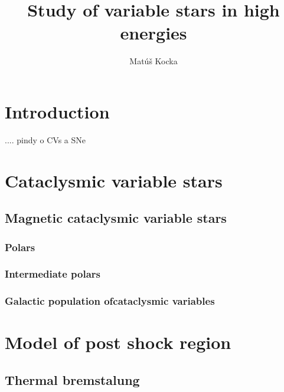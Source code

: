\documentclass[oneside,a4paper,11pt]{report}
\title{Study of variable stars in high energies }
\author{Matúš Kocka}
\begin{document}
\tableofcontents

\chapter*{Introduction}

.... pindy o CVs a SNe 

\chapter{Cataclysmic variable stars }

 
\section{Magnetic cataclysmic variable stars }
\subsection{Polars}
\subsection{Intermediate polars}
\subsection{Galactic population ofcataclysmic variables }
\label{GXRE}

\chapter{Model of post shock region}
\section{Thermal bremstalung}
\end{document}

